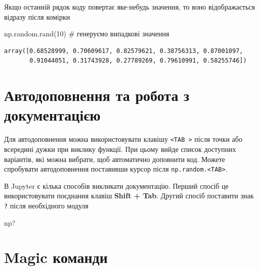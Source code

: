 \documentclass[
  letterpaper,
]{report}
\newenvironment{Shaded}{\begin{snugshade}}{\end{snugshade}}
\newcommand{\CommentTok}[1]{\textcolor[rgb]{0.37,0.37,0.37}{#1}}
\newcommand{\DecValTok}[1]{\textcolor[rgb]{0.68,0.00,0.00}{#1}}
\newcommand{\NormalTok}[1]{\textcolor[rgb]{0.00,0.23,0.31}{#1}}
\begin{document}
Якщо останній рядок коду повертає яке-небудь значення, то воно
відображається відразу після комірки

\begin{Shaded}
\begin{Highlighting}[]
\NormalTok{np.random.rand(}\DecValTok{10}\NormalTok{) }\CommentTok{\# генеруємо випадкові значення}
\end{Highlighting}
\end{Shaded}

\begin{verbatim}
array([0.68528999, 0.70609617, 0.82579621, 0.38756313, 0.87001097,
       0.91044051, 0.31743928, 0.27789269, 0.79610991, 0.58255746])
\end{verbatim}

\hypertarget{ux430ux432ux442ux43eux434ux43eux43fux43eux432ux43dux435ux43dux43dux44f-ux442ux430-ux440ux43eux431ux43eux442ux430-ux437-ux434ux43eux43aux443ux43cux435ux43dux442ux430ux446ux456ux454ux44e}{%
\section{Автодоповнення та робота з
документацією}\label{ux430ux432ux442ux43eux434ux43eux43fux43eux432ux43dux435ux43dux43dux44f-ux442ux430-ux440ux43eux431ux43eux442ux430-ux437-ux434ux43eux43aux443ux43cux435ux43dux442ux430ux446ux456ux454ux44e}}

Для автодоповнення можна використовувати клавішу
\texttt{\textless{}TAB\ \textgreater{}} після точки або всередині дужки
при виклику функції. При цьому вийде список доступних варіантів, які
можна вибрати, щоб автоматично доповнити код. Можете спробувати
автодоповнення поставивши курсор після
\texttt{np.random.\textless{}TAB\textgreater{}}.

В Jupyter є кілька способів викликати документацію. Перший спосіб це
використовувати поєднання клавіш \textbf{Shift + Tab}. Другий спосіб
поставити знак \texttt{?} після необхідного модуля

\begin{Shaded}
\begin{Highlighting}[]
\NormalTok{np?}
\end{Highlighting}
\end{Shaded}

\hypertarget{magic-ux43aux43eux43cux430ux43dux434ux438}{%
\section{Magic
команди}\label{magic-ux43aux43eux43cux430ux43dux434ux438}}
\end{document}
